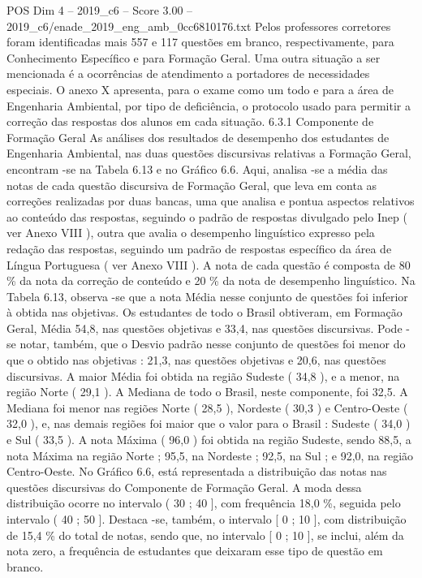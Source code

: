 \begin{textsample}{POS Dim 4 – 2019\_c6 – Score 3.00 – 2019\_c6/enade\_2019\_eng\_amb\_0cc6810176.txt}
Pelos professores corretores foram identificadas mais 557 e 117 questões em branco, respectivamente, para Conhecimento Específico e para Formação Geral.
Uma outra situação a ser mencionada é a ocorrências de atendimento a portadores de necessidades especiais.
O anexo X apresenta, para o exame como um todo e para a área de Engenharia Ambiental, por tipo de deficiência, o protocolo usado para permitir a correção das respostas dos alunos em cada situação. 6.3.1 Componente de Formação Geral As análises dos resultados de desempenho dos estudantes de Engenharia Ambiental, nas duas questões discursivas relativas a Formação Geral, encontram -se na Tabela 6.13 e no Gráfico 6.6.
Aqui, analisa -se a média das notas de cada questão discursiva de Formação Geral, que leva em conta as correções realizadas por duas bancas, uma que analisa e pontua aspectos relativos ao conteúdo das respostas, seguindo o padrão de respostas divulgado pelo Inep ( ver Anexo VIII ), outra que avalia o desempenho linguístico expresso pela redação das respostas, seguindo um padrão de respostas específico da área de Língua Portuguesa ( ver Anexo VIII ).
A nota de cada questão é composta de 80 \% da nota da correção de conteúdo e 20 \% da nota de desempenho linguístico.
Na Tabela 6.13, observa -se que a nota Média nesse conjunto de questões foi inferior à obtida nas objetivas.
Os estudantes de todo o Brasil obtiveram, em Formação Geral, Média 54,8, nas questões objetivas e 33,4, nas questões discursivas.
Pode -se notar, também, que o Desvio padrão nesse conjunto de questões foi menor do que o obtido nas objetivas : 21,3, nas questões objetivas e 20,6, nas questões discursivas.
A maior Média foi obtida na região Sudeste ( 34,8 ), e a menor, na região Norte ( 29,1 ).
A Mediana de todo o Brasil, neste componente, foi 32,5.
A Mediana foi menor nas regiões Norte ( 28,5 ), Nordeste ( 30,3 ) e Centro-Oeste ( 32,0 ), e, nas demais regiões foi maior que o valor para o Brasil : Sudeste ( 34,0 ) e Sul ( 33,5 ).
A nota Máxima ( 96,0 ) foi obtida na região Sudeste, sendo 88,5, a nota Máxima na região Norte ; 95,5, na Nordeste ; 92,5, na Sul ; e 92,0, na região Centro-Oeste.
No Gráfico 6.6, está representada a distribuição das notas nas questões discursivas do Componente de Formação Geral.
A moda dessa distribuição ocorre no intervalo ( 30 ; 40 ], com frequência 18,0 \%, seguida pelo intervalo ( 40 ; 50 ].
Destaca -se, também, o intervalo [ 0 ; 10 ], com distribuição de 15,4 \% do total de notas, sendo que, no intervalo [ 0 ; 10 ], se inclui, além da nota zero, a frequência de estudantes que deixaram esse tipo de questão em branco.

\end{textsample}
